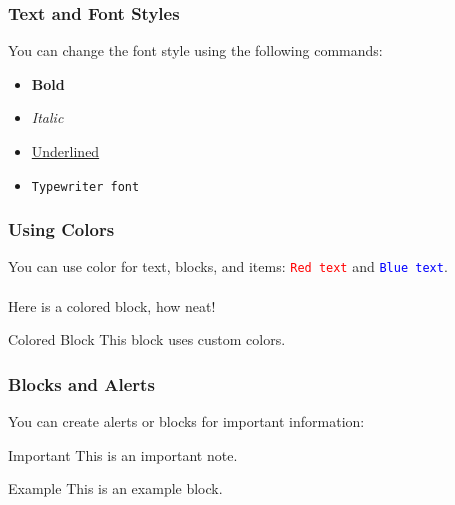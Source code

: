 \documentclass[aspectratio=169]{beamer} %
\begin{document}
	\begin{frame}
		\frametitle{Text and Font Styles} %
		You can change the font style using the following commands:
			\begin{itemize} [label=\textbullet] %
				\item \textbf{Bold} %
				\item \textit{Italic} %
				\item \underline{Underlined} %
				\item \texttt{Typewriter font} %
			\end{itemize}
	\end{frame}
	
	\begin{frame}
		\frametitle{Using Colors} %
		You can use color for text, blocks, and items:
		 \texttt{\textcolor{red}{Red text}} and \texttt{\textcolor{blue}{Blue text}}. %
		 ~\\~\\
		Here is a colored block, how neat!
			\begin{block}{Colored Block} %
    				This block uses custom colors.
  			\end{block}
	\end{frame}
	
	\begin{frame}
		\frametitle{Blocks and Alerts} %
		 You can create alerts or blocks for important information:
		 
		 \begin{alertblock}{Important} %
			This is an important note. %
			\end{alertblock} %
  
		\begin{exampleblock}{Example} %
			This is an example block. %
			\end{exampleblock} %
  
	\end{frame}
	
\end{document}
